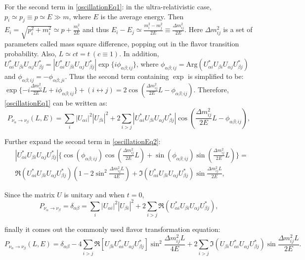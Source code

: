 For the second term in \ref{oscillationEq1}: in the ultra-relativistic case, $p_i\simeq p_j\equiv p\simeq E\gg m$, where $E$ is the average energy. Then $E_i=\sqrt{p^2_i+m^2_i}\simeq p+\frac{m_i^2}{2E}$ and thus $E_i-E_j\simeq \frac{m^2_i-m^2_j}{2E}\equiv \frac{\Delta m^2_{ij}}{2E}$\cite{pdg2018,aitchison2012gauge}. Here $\Delta m^2_{ij}$ is a set of parameters called mass square difference, popping out in the flavor transition probability. Also, $L\simeq ct=t~(c\equiv 1)$. In addition, $U^*_{\alpha i}U_{\beta i}U_{\alpha j}U^*_{\beta j}=|U^*_{\alpha i}U_{\beta i}U_{\alpha j}U^*_{\beta j}|\exp\{i\phi_{\alpha\beta;ij}\}$, where $\phi_{\alpha\beta;ij}=\mathrm{Arg}(U^*_{\alpha i}U_{\beta i}U_{\alpha j}U^*_{\beta j})$ and $\phi_{\alpha\beta;ij}=-\phi_{\alpha\beta;ji}$. Thus the second term containing $\exp$ is simplified to be:
$\exp\{-i\frac{\Delta m^2_{ij}}{2E}L+i\phi_{\alpha\beta;ij}\}+(i\leftrightarrow j)=2\cos(\frac{\Delta m^2_{ij}}{2E}L-\phi_{\alpha\beta;ij})$. Therefore, \ref{oscillationEq1} can be written as\cite{aitchison2012gauge}:
\begin{equation}\label{oscillationEq2}
P_{\nu_\alpha\to\nu_\beta}(L,E)=
\sum_i |U_{\alpha i}|^2|U_{\beta i}|^2 + 2\sum_{i>j}|U^*_{\alpha i}U_{\beta i}U_{\alpha j}U^*_{\beta j}|\cos(\frac{\Delta m^2_{ij}}{2E}L-\phi_{\alpha\beta;ij}),
\end{equation}

Further expand the second term in \ref{oscillationEq2}:
\begin{equation}
 \begin{split}
&|U^*_{\alpha i}U_{\beta i}U_{\alpha j}U^*_{\beta j}|\{\cos(\phi_{\alpha\beta;ij})\cos(\frac{\Delta m^2_{ij}}{2E}L)+\sin(\phi_{\alpha\beta;ij})\sin(\frac{\Delta m^2_{ij}}{2E}L)\}=\\
&\Re(U^*_{\alpha i}U_{\beta i}U_{\alpha j}U^*_{\beta j})(1-2\sin^2\frac{\Delta m^2_{ij}L}{4E})+\Im(U^*_{\alpha i}U_{\beta i}U_{\alpha j}U^*_{\beta j})\sin\frac{\Delta m^2_{ij}L}{2E},
 \end{split}
\end{equation}

Since the matrix $U$ is unitary and when $t=0$, 
\begin{equation}
P_{\nu_\alpha\to\nu_\beta}=\delta_{\alpha\beta}=\sum_i |U_{\alpha i}|^2|U_{\beta i}|^2+2\sum_{i>j}\Re(U^*_{\alpha i}U_{\beta i}U_{\alpha j}U^*_{\beta j}),
\end{equation} 

finally it comes out the commonly used flavor transformation equation\cite{pdg2018,aitchison2012gauge}:
\begin{equation}
P_{\nu_\alpha\to\nu_\beta}(L,E)=\delta_{\alpha\beta}-4\sum_{i>j} \Re[U_{\beta i}U^*_{\alpha i}U_{\alpha j}U^*_{\beta j}]\sin^2\frac{\Delta m^2_{ij}L}{4E}+2\sum_{i>j} \Im(U_{\beta i}U^*_{\alpha i}U_{\alpha j}U^*_{\beta j})\sin\frac{\Delta m^2_{ij}L}{2E}.
\end{equation}

